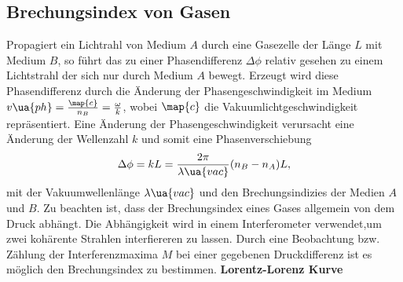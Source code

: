 \subsection{Brechungsindex von Gasen}
Propagiert ein Lichtrahl von Medium $A$ durch eine Gasezelle der Länge $L$ mit Medium $B$,
so führt das zu einer Phasendifferenz $\Delta\phi$ relativ gesehen zu einem Lichtstrahl der sich
nur durch Medium $A$ bewegt. Erzeugt wird diese Phasendifferenz durch die Änderung der
Phasengeschwindigkeit im Medium $v\ua{ph}=\frac{\map{c}}{n_B}=\frac{\omega}{k}$, wobei $\map{c}$
die Vakuumlichtgeschwindigkeit repräsentiert. Eine Änderung der Phasengeschwindigkeit
verursacht eine Änderung der Wellenzahl $k$ und somit eine Phasenverschiebung
\begin{equation}
  \label{eq:phase_shit_gases}
\Delta\phi = kL = \frac{2\pi}{\lambda\ua{vac}}(n_B-n_A)L,
\end{equation}
mit der Vakuumwellenlänge $\lambda\ua{vac}$ und den Brechungsindizies der
Medien $A$ und $B$.
Zu beachten ist, dass der Brechungsindex eines Gases allgemein von dem Druck abhängt.
Die Abhängigkeit wird in einem Interferometer verwendet,um zwei kohärente Strahlen
interfiereren zu lassen.
Durch eine Beobachtung bzw. Zählung der Interferenzmaxima $M$ bei einer gegebenen Druckdifferenz
ist es möglich den Brechungsindex zu bestimmen.
\textbf{Lorentz-Lorenz Kurve}

